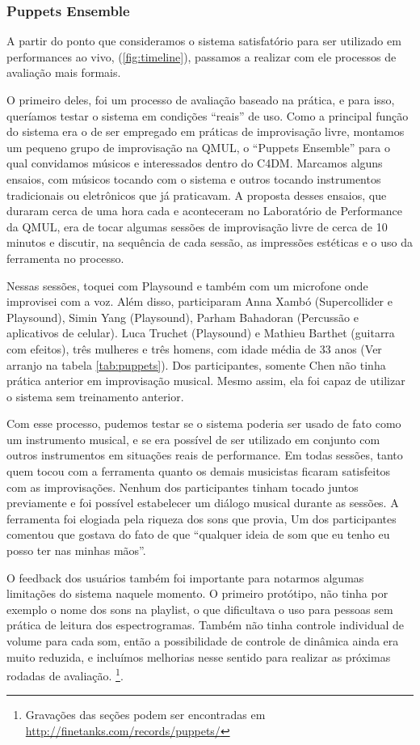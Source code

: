 \subsubsection{Puppets Ensemble}

A partir do ponto que consideramos o sistema satisfatório para ser utilizado em performances ao vivo, (\ref{fig:timeline}), passamos a realizar com ele processos de avaliação mais formais. 

O primeiro deles, foi um processo de avaliação baseado na prática, e para isso, queríamos testar o sistema em condições ``reais'' de uso. Como a principal função do sistema era o de ser empregado em práticas de improvisação livre, montamos um pequeno grupo de improvisação na QMUL, o ``Puppets Ensemble'' para o qual convidamos músicos e interessados dentro do C4DM. Marcamos alguns ensaios, com músicos tocando com o sistema e outros tocando instrumentos tradicionais ou eletrônicos que já praticavam. A proposta desses ensaios, que duraram cerca de uma hora cada e aconteceram no Laboratório de Performance da QMUL, era de tocar algumas sessões de improvisação livre de cerca de 10 minutos e discutir, na sequência de cada sessão, as impressões estéticas e o uso da ferramenta no processo.

Nessas sessões, toquei com Playsound e também com um microfone onde improvisei com a voz. Além disso, participaram Anna Xambó (Supercollider e Playsound), Simin Yang (Playsound), Parham Bahadoran (Percussão e aplicativos de celular). Luca Truchet (Playsound) e Mathieu Barthet (guitarra com efeitos), três mulheres e três homens, com idade média de 33 anos (Ver arranjo na tabela \ref{tab:puppets}). Dos participantes, somente Chen não tinha prática anterior em improvisação musical. Mesmo assim, ela foi capaz de utilizar o sistema sem treinamento anterior.

Com esse processo, pudemos testar se o sistema poderia ser usado de fato como um instrumento musical, e se era possível de ser utilizado em conjunto com outros instrumentos em situações reais de performance. Em todas sessões, tanto quem tocou com a ferramenta quanto os demais musicistas ficaram satisfeitos com as improvisações. Nenhum dos participantes tinham tocado juntos previamente e foi possível estabelecer um diálogo musical durante as sessões. A ferramenta foi elogiada pela riqueza dos sons que provia, Um dos participantes comentou que gostava do fato de que ``qualquer ideia de som que eu tenho eu posso ter nas minhas mãos''. 

O feedback dos usuários também foi importante para notarmos algumas limitações do sistema naquele momento. O primeiro protótipo, não tinha por exemplo o nome dos sons na playlist, o que dificultava o uso para pessoas sem prática de leitura dos espectrogramas. Também não tinha controle individual de volume para cada som, então a possibilidade de controle de dinâmica ainda era muito reduzida, e incluímos melhorias nesse sentido para realizar as próximas rodadas de avaliação.   \footnote{Gravações das seções podem ser encontradas em \url{http://finetanks.com/records/puppets/}}.

